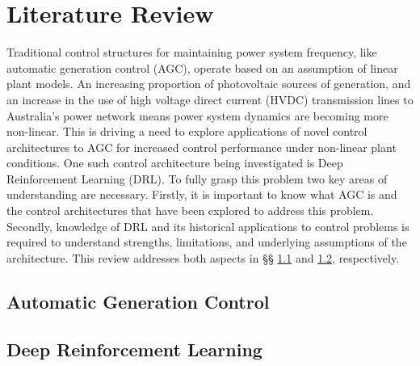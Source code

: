 \section{Literature Review}

Traditional control structures for maintaining power system frequency, like automatic generation control (AGC), operate based on an assumption of linear plant models. An increasing proportion of photovoltaic sources of generation, and an increase in the use of high voltage direct current (HVDC) transmission lines to Australia's power network means power system dynamics are becoming more non-linear. This is driving a need to explore applications of novel control architectures to AGC for increased control performance under non-linear plant conditions. One such control architecture being investigated is Deep Reinforcement Learning (DRL). To fully grasp this problem two key areas of understanding are necessary. Firstly, it is important to know what AGC is and the control architectures that have been explored to address this problem. Secondly, knowledge of DRL and its historical applications to control problems is required to understand strengths, limitations, and underlying assumptions of the architecture. This review addresses both aspects in \S{}\S{} \ref{agc} and \ref{drl}, respectively.


\subsection{Automatic Generation Control}\label{agc}









\subsection{Deep Reinforcement Learning}\label{drl}




